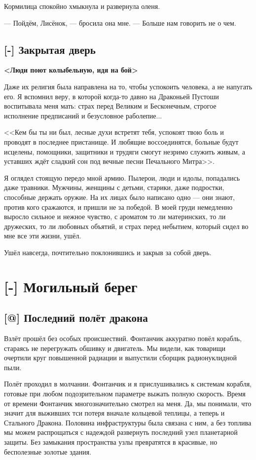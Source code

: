 Кормилица спокойно хмыкнула и развернула оленя.

--- Пойдём, Лисёнок, --- бросила она мне.
--- Больше нам говорить не о чем.

\section{[-] Закрытая дверь}

\textbf{<Люди поют колыбельную, идя на бой>}

Даже их религия была направлена на то, чтобы успокоить человека, а не напугать его.
Я вспомнил веру, в которой когда-то давно на Драконьей Пустоши воспитывала меня мать: страх перед Великим и Бесконечным, строгое исполнение предписаний и безусловное раболепие...

<<Кем бы ты ни был, лесные духи встретят тебя, успокоят твою боль и проводят в последнее пристанище.
И любящие воссоединятся, больные будут исцелены, помощники, защитники и трудяги смогут незримо служить живым, а уставших ждёт сладкий сон под вечные песни Печального Митра>>.

Я оглядел стоящую передо мной армию.
Пылерои, люди и идолы, попадались даже травники.
Мужчины, женщины с детьми, старики, даже подростки, способные держать оружие.
На их лицах было написано одно --- они знают, против кого сражаются, и пришли не за победой.
В моей груди немедленно выросло сильное и нежное чувство, с ароматом то ли материнских, то ли дружеских, то ли любовных объятий, и страх перед небытием, который сидел во мне все эти жизни, ушёл.

Ушёл навсегда, почтительно поклонившись и закрыв за собой дверь.

\chapter{[-] Могильный берег}

\section{[@] Последний полёт дракона}

Взлёт прошёл без особых происшествий.
Фонтанчик аккуратно повёл корабль, стараясь не перегружать обшивку и двигатель.
Мы видели, как товарищи очертили круг повышенной радиации и выпустили сборщик радионуклидной пыли.

Полёт проходил в молчании.
Фонтанчик и я прислушивались к системам корабля, готовые при любом подозрительном параметре выжать полную скорость.
Время от времени Фонтанчик многозначительно смотрел на меня.
Да, мы понимали, что значит для выживших тси потеря вначале кольцевой теплицы, а теперь и Стального Дракона.
Половина инфраструктуры была связана с ним, а без топлива мы можем распрощаться с надеждой развернуть последний узел планетарной защиты.
Без замыкания пространства узлы превратятся в красивые, но бесполезные золотые здания.

